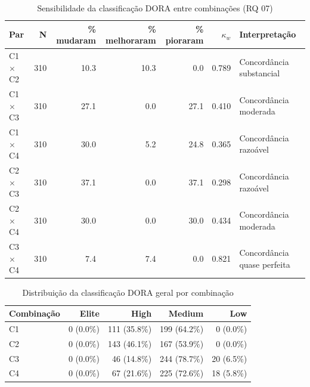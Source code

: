 \begin{table}[htbp]
\centering
\caption{Sensibilidade da classificação DORA entre combinações (RQ 07)}
\label{tab:rq07_pares}
\begin{tabular}{|l|r|r|r|r|r|l|}
\hline
\textbf{Par} & \textbf{N} & \textbf{\% mudaram} & \textbf{\% melhoraram} & \textbf{\% pioraram} & \textbf{$\kappa_w$} & \textbf{Interpretação} \\
\hline
C1 $\times$ C2 & 310 & 10.3 & 10.3 & 0.0 & 0.789 & Concordância substancial \\
C1 $\times$ C3 & 310 & 27.1 & 0.0 & 27.1 & 0.410 & Concordância moderada \\
C1 $\times$ C4 & 310 & 30.0 & 5.2 & 24.8 & 0.365 & Concordância razoável \\
C2 $\times$ C3 & 310 & 37.1 & 0.0 & 37.1 & 0.298 & Concordância razoável \\
C2 $\times$ C4 & 310 & 30.0 & 0.0 & 30.0 & 0.434 & Concordância moderada \\
C3 $\times$ C4 & 310 & 7.4 & 7.4 & 0.0 & 0.821 & Concordância quase perfeita \\
\hline
\end{tabular}
\end{table}

\begin{table}[htbp]
\centering
\caption{Distribuição da classificação DORA geral por combinação}
\label{tab:rq07_distribuicao}
\begin{tabular}{|l|r|r|r|r|}
\hline
\textbf{Combinação} & \textbf{Elite} & \textbf{High} & \textbf{Medium} & \textbf{Low} \\
\hline
C1 & 0 (0.0\%) & 111 (35.8\%) & 199 (64.2\%) & 0 (0.0\%) \\
C2 & 0 (0.0\%) & 143 (46.1\%) & 167 (53.9\%) & 0 (0.0\%) \\
C3 & 0 (0.0\%) & 46 (14.8\%) & 244 (78.7\%) & 20 (6.5\%) \\
C4 & 0 (0.0\%) & 67 (21.6\%) & 225 (72.6\%) & 18 (5.8\%) \\
\hline
\end{tabular}
\end{table}
